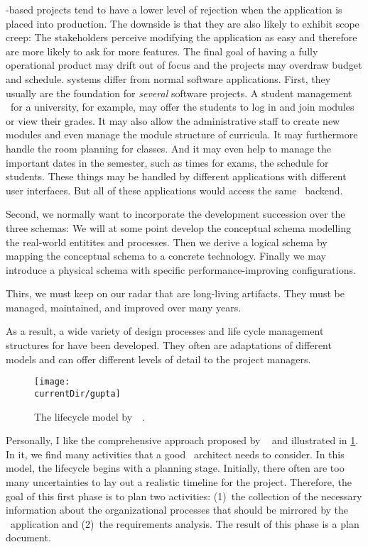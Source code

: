 -based projects tend to have a lower level of rejection when the application is placed into production.
The downside is that they are also likely to exhibit scope creep:
The stakeholders perceive modifying the application as easy and therefore are more likely to ask for more features.
The final goal of having a fully operational product may drift out of focus and the projects may overdraw budget and schedule.%
\FloatBarrier%
\endhsection%
%
%
\FloatBarrier%
%
 systems differ from normal software applications.
First, they usually are the foundation for \emph{several} software projects.
A student management \db\ for a university, for example, may offer the students to log in and join modules or view their grades.
It may also allow the administrative staff to create new modules and even manage the module structure of curricula.
It may furthermore handle the room planning for classes.
And it may even help to manage the important dates in the semester, such as times for exams, the schedule for students.
These things may be handled by different applications with different user interfaces.
But all of these applications would access the same \db\ backend.

Second, we normally want to incorporate the development succession over the three schemas:
We will at some point develop the conceptual schema modelling the real-world entitites and processes.
Then we derive a logical schema by mapping the conceptual schema to a concrete technology.
Finally we may introduce a physical schema with specific performance-improving configurations.

Thirs, we must keep on our radar that  are long-living artifacts.
They must be managed, maintained, and improved over many years.

As a result, a wide variety of design processes and life cycle management structures for  have been developed.
They often are adaptations of different  models and can offer different levels of detail to the project managers.

\begin{figure}%
\centering%
\texttt{[image: \\currentDir/gupta]}%
\caption{The lifecycle model by~\citeauthor{GMTM2011DDLC}~\cite{GMTM2011DDLC}.}%
\label{fig:model:gupta}%
\end{figure}%
%
Personally, I like the comprehensive approach proposed by \citeauthor{GMTM2011DDLC}~\cite{GMTM2011DDLC} and illustrated in \cref{fig:model:gupta}.
In it, we find many activities that a good \db~architect needs to consider.
In this model, the lifecycle begins with a planning stage.
Initially, there often are too many uncertainties to lay out a realistic timeline for the project.
Therefore, the goal of this first phase is to plan two activities:
(1)~the collection of the necessary information about the organizational processes that should be mirrored by the \db\ application and (2)~the requirements analysis.
The result of this phase is a plan document.

